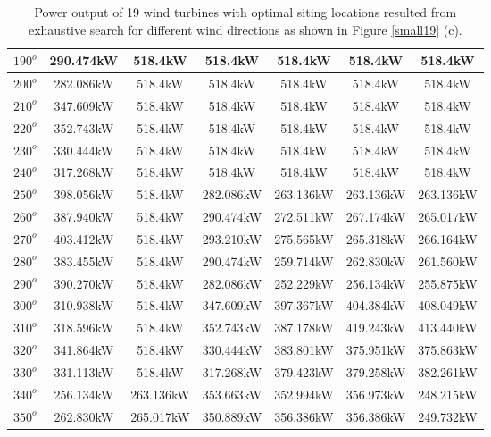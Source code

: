 \begin{table}[H]
\begin{tabular}{|c|c|c|c|c|c|c|}
		$190^o$	& 290.474kW	& 518.4kW	& 518.4kW	& 518.4kW	& 518.4kW	& 518.4kW	\\ \hline
		$200^o$	& 282.086kW	& 518.4kW	& 518.4kW	& 518.4kW	& 518.4kW	& 518.4kW	\\ \hline
		$210^o$	& 347.609kW	& 518.4kW	& 518.4kW	& 518.4kW	& 518.4kW	& 518.4kW	\\ \hline
		$220^o$	& 352.743kW	& 518.4kW	& 518.4kW	& 518.4kW	& 518.4kW	& 518.4kW	\\ \hline
		$230^o$	& 330.444kW	& 518.4kW	& 518.4kW	& 518.4kW	& 518.4kW	& 518.4kW	\\ \hline
		$240^o$	& 317.268kW	& 518.4kW	& 518.4kW	& 518.4kW	& 518.4kW	& 518.4kW	\\ \hline
		$250^o$	& 398.056kW	& 518.4kW	& 282.086kW	& 263.136kW	& 263.136kW	& 263.136kW	\\ \hline
		$260^o$	& 387.940kW	& 518.4kW	& 290.474kW	& 272.511kW	& 267.174kW	& 265.017kW	\\ \hline
		$270^o$	& 403.412kW	& 518.4kW	& 293.210kW	& 275.565kW	& 265.318kW	& 266.164kW	\\ \hline
		$280^o$	& 383.455kW	& 518.4kW	& 290.474kW	& 259.714kW	& 262.830kW	& 261.560kW	\\ \hline
		$290^o$	& 390.270kW	& 518.4kW	& 282.086kW	& 252.229kW	& 256.134kW	& 255.875kW	\\ \hline
		$300^o$	& 310.938kW	& 518.4kW	& 347.609kW	& 397.367kW	& 404.384kW	& 408.049kW	\\ \hline
		$310^o$	& 318.596kW	& 518.4kW	& 352.743kW	& 387.178kW	& 419.243kW	& 413.440kW	\\ \hline
		$320^o$	& 341.864kW	& 518.4kW	& 330.444kW	& 383.801kW	& 375.951kW	& 375.863kW	\\ \hline
		$330^o$	& 331.113kW	& 518.4kW	& 317.268kW	& 379.423kW	& 379.258kW	& 382.261kW	\\ \hline
		$340^o$	& 256.134kW	& 263.136kW	& 353.663kW	& 352.994kW	& 356.973kW	& 248.215kW	\\ \hline
		$350^o$	& 262.830kW	& 265.017kW	& 350.889kW	& 356.386kW	& 356.386kW	& 249.732kW	\\ \hline
        	\end{tabular}
        	\caption{Power output of 19 wind turbines with optimal siting locations resulted from exhaustive search for different wind directions as shown in Figure \ref{small19} (c).}
        	\label{table19c}
        \end{table}
        \doublespacing
        
